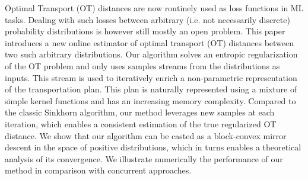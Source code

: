 Optimal Transport (OT) distances are now routinely used as loss functions in ML tasks. Dealing with such losses between arbitrary (i.e. not necessarily discrete) probability distributions is however still mostly an open problem.
%
This paper introduces a new online estimator of optimal transport (OT) distances between two such arbitrary distributions. 
%
Our algorithm solves an entropic regularization of the OT problem and only uses samples streams from the distributions as inputs. 
%
This stream is used to iteratively enrich a non-parametric representation of the transportation plan. 
%
This plan is naturally represented using a mixture of simple kernel functions and has an increasing memory complexity. 
%
Compared to the classic Sinkhorn algorithm, our method leverages new samples at each iteration, which enables a consistent estimation of the true regularized OT distance. 
%
We show that our algorithm can be casted as a block-convex mirror descent in the space of positive distributions, which in turns enables a theoretical analysis of its convergence. 
%
We illustrate numerically the performance of our method in comparison with concurrent approaches.